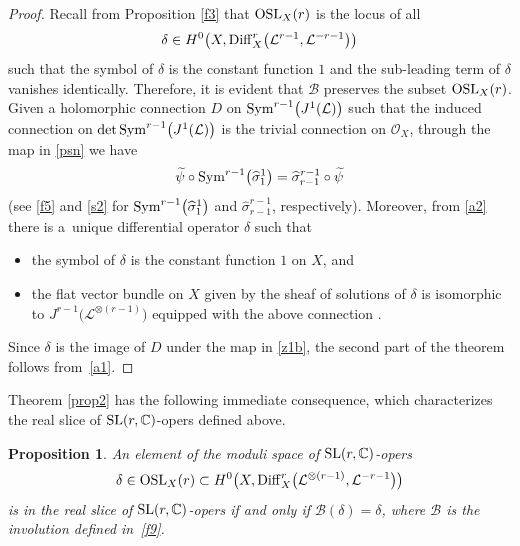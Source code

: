 \documentclass[pdftex]{sigma}
\numberwithin{equation}{section}
\newtheorem{Proposition}[Theorem]{Proposition}
 { \theoremstyle{definition}
\newtheorem{Definition}[Theorem]{Definition}
\newtheorem{Note}[Theorem]{Note}
\newtheorem{Example}[Theorem]{Example}
\newtheorem{Remark}[Theorem]{Remark} }
\begin{document}
\begin{proof}
Recall from Proposition \ref{f3} that ${\rm OSL}_X(r)$ is the locus of all
\[
\delta \in H^0\bigl(X, {\rm
Diff}^r_X\bigl({\mathcal L}^{r-1}, {\mathcal L}^{-r-1}\bigr)\bigr)\]
 such that the symbol of $\delta$ is
the constant function $1$ and the sub-leading term of $\delta$ vanishes identically.
Therefore, it is evident that $\mathcal B$ preserves the subset ${\rm OSL}_X(r)$.
Given a holomorphic connection $D$ on
${\rm Sym}^{r-1}\bigl(J^1(\mathcal L)\bigr)$ such that the induced connection on $\det {\rm
Sym}^{r-1}\bigl(J^1(\mathcal L)\bigr)$ is the trivial connection on ${\mathcal O}_X$,
through the map \smash{$\widetilde{\psi}$} in \eqref{psn} we have
\begin{equation}\label{a1}
\widetilde{\psi}\circ{\rm Sym}^{r-1}\bigl(\widehat{\sigma}^1_1\bigr) = \widehat{\sigma}^{r-1}_{r-1}
\circ\widetilde{\psi}
\end{equation}
(see \eqref{f5} and \eqref{s2} for ${\rm Sym}^{r-1}\bigl(\widehat{\sigma}^1_1\bigr)$ and
$\widehat{\sigma}^{r-1}_{r-1}$, respectively). Moreover, from \eqref{a2}
there is a~unique differential operator $\delta$ such that
\begin{itemize}\itemsep=0pt
\item the symbol of $\delta$ is the constant function $1$ on $X$, and

\item the flat vector bundle on $X$ given by the sheaf of solutions of $\delta$ is isomorphic to
$J^{r-1}\!\bigl(\!{\mathcal L}^{\otimes (\!r-1\!)}\bigr)$ equipped with the above connection .
\end{itemize}
Since $\delta$ is the image of $D$ under the map in \eqref{z1b}, the second
part of the theorem follows from~\eqref{a1}.
\end{proof}

Theorem \ref{prop2} has the following immediate consequence, which characterizes the real slice of ${\rm SL}(r,\mathbb{C})$-opers defined above.

\begin{Proposition}\label{corpr2}
An element of the moduli space of ${\rm SL}(r,\mathbb{C})$-opers
\[
\delta \in {\rm OSL}_X(r) \subset H^0\bigl(X,
{\rm Diff}^r_X\bigl({\mathcal L}^{\otimes (r-1)}, {\mathcal L}^{-r-1}\bigr)\bigr)
\]
is in the real slice of ${\rm SL}(r,{\mathbb C})$-opers if and only if
${\mathcal B}(\delta) = \delta$, where $\mathcal B$ is the involution defined in~\eqref{f9}.
\end{Proposition}
\end{document}
